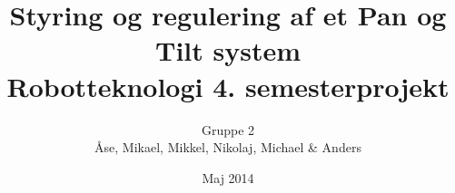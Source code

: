 \title{Styring og regulering af et Pan og Tilt system \\Robotteknologi 4. semesterprojekt}
\author{Gruppe 2 \\ Åse, Mikael, Mikkel, Nikolaj, Michael \& Anders}
\date{Maj 2014}
\maketitle



